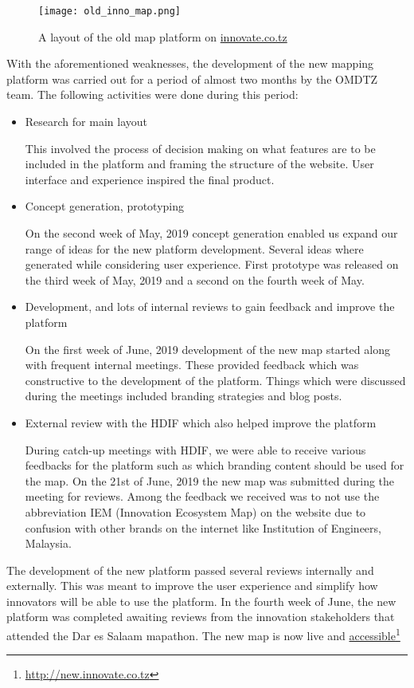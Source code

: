 \documentclass[a4paper,12pt,twoside]{article}
\begin{document}
\begin{figure}[h]
    \centering
    \texttt{[image: old\_inno\_map.png]}
    \caption{A layout of the old map platform on \href{innovate.co.tz}{innovate.co.tz}}
\end{figure}

With the aforementioned weaknesses, the development of the new mapping platform was carried out for a period of almost two months by the OMDTZ team. The following activities were done during this period:


\begin{itemize}
	\item Research for main layout
	
	This involved the process of decision making on what features are to be included in the platform and framing the structure of the website. User interface and experience inspired the final product.
	
	\item Concept generation, prototyping
	
	On the second week of May, 2019 concept generation enabled us expand our range of ideas for the new platform development. Several ideas where generated while considering user  experience. First prototype was released on the third week of May, 2019 and a second on the fourth week of May.
	
	\item Development, and lots of internal reviews to gain feedback and improve the platform
	
	On the first week of June, 2019 development of the new map started along with frequent internal meetings. These provided feedback which was constructive to the development of the platform. Things which were discussed during the meetings included branding strategies and blog posts.
	
	\item External review with the HDIF which also helped improve the platform
	
	During catch-up meetings with HDIF, we were able to receive various feedbacks for the platform such as which branding content should be used for the map. On the 21st of June, 2019 the new map was submitted during the meeting for reviews. Among the feedback we received was to not use the abbreviation IEM (Innovation Ecosystem Map) on the website due to confusion with other brands on the internet like Institution of Engineers, Malaysia.
\end{itemize}

The development of the new platform passed several reviews internally and externally. This was meant to improve the user experience and simplify how innovators will be able to use the platform. In the fourth week of June, the new platform was completed awaiting reviews from the innovation stakeholders that attended the Dar es Salaam mapathon. The new map is now live and \href{http://new.innovate.co.tz}{accessible}\footnote{\url{http://new.innovate.co.tz}}
\end{document}
